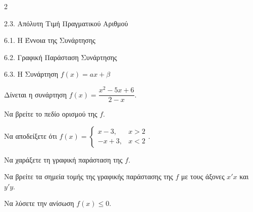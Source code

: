 \begin{ylh}{2}
    \item 2.3. Απόλυτη Τιμή Πραγματικού Αριθμού
    \item 6.1. Η Έννοια της Συνάρτησης
    \item 6.2. Γραφική Παράσταση Συνάρτησης
    \item 6.3. Η Συνάρτηση $f(x)=ax+\beta$
\end{ylh}
Δίνεται η συνάρτηση $f(x) = \dfrac{x^2 - 5x + 6}{2 - x}$.
\begin{alist}
\item Να βρείτε το πεδίο ορισμού της $f$. 
\item Να αποδείξετε ότι $f(x) = \begin{cases} x - 3, & x > 2 \\ -x + 3, & x < 2 \end{cases}$. 
\begin{rlist}
\item Να χαράξετε τη γραφική παράσταση της $f$. 
\item Να βρείτε τα σημεία τομής της γραφικής παράστασης της $f$ με τους άξονες $x'x$ και $y'y$. 
\end{rlist}
\item Να λύσετε την ανίσωση $f(x) \le 0$. 
\end{alist}

